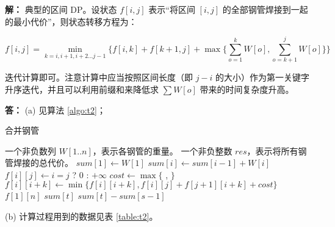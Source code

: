 \documentclass[12pt,a4paper]{ctexart}
\begin{document}
\textbf{解：} 典型的区间 DP。设状态 $f[i, j]$ 表示“将区间 $[i, j]$ 的全部钢管焊接到一起的最小代价”，则状态转移方程为：

\begin{equation}
  f[i, j] = \min_{k=i,i+1,i+2...j-1}\{f[i, k] + f[k + 1, j] + \max\{\sum_{o=1}^kW[o], \sum_{o=k+1}^jW[o]\}\} \label{formula:t2}
\end{equation}

迭代计算即可。注意计算中应当按照区间长度（即 $j-i$ 的大小）作为第一关键字升序迭代，并且可以利用前缀和来降低求 $\sum W[o]$ 带来的时间复杂度升高。

\vspace{5pt}
\noindent
{\bf 答：} (a) 见算法 \ref{algo:t2}；

\begin{algorithm}
  \caption{合并钢管} \label{algo:t2}
  \begin{algorithmic}[1]
    \Require 一个非负数列 $W[1..n]$，表示各钢管的重量。
    \Ensure 一个非负整数 $res$，表示将所有钢管焊接的总代价。
      \State $sum[1] \gets W[1]$
        \State $sum[i] \gets sum[i - 1] + W[i]$
      \EndFor
          \State $f[i][j] \gets i = j$ ? 0 : $+\infty$
        \EndFor
      \EndFor
       
         
           
            \State $cost \gets \max\{$ ,  $\}$ 
            \State $f[i][i + k] \gets \min\{f[i][i + k], f[i][j] + f[j + 1][i + k] + cost \}$
          \EndFor
        \EndFor
      \EndFor
      \State \Return $f[1][n]$
      \Statex
          \State \Return $sum[t]$
        \Else
          \State \Return $sum[t] - sum[s - 1]$
        \EndIf
      \EndFunction
    \EndFunction
  \end{algorithmic}
\end{algorithm}

(b) 计算过程用到的数据见表 \ref{table:t2}。
\end{document}
